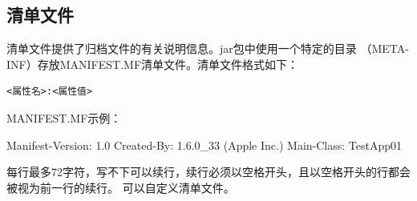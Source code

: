 \subsection{清单文件}

清单文件提供了归档文件的有关说明信息。jar包中使用一个特定的目录
（META-INF）存放MANIFEST.MF清单文件。清单文件格式如下：

\begin{verbatim}
<属性名>:<属性值>
\end{verbatim}

MANIFEST.MF示例：

\begin{shCode}
  Manifest-Version: 1.0
  Created-By: 1.6.0_33 (Apple Inc.)
  Main-Class: TestApp01
\end{shCode}

每行最多72字符，写不下可以续行，续行必须以空格开头，且以空格开头的行都会被视为前一行的续行。
可以自定义清单文件。